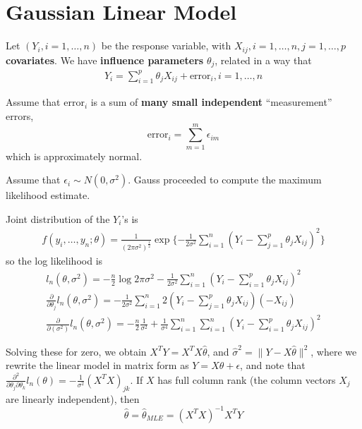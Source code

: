 
\chapter{Gaussian Linear Model}
\label{cha:gauss-line-model}

Let $(Y_{i}, i = 1, \dots, n)$ be the response variable, with $X_{ij},
i = 1, \dots, n, j = 1, \dots, p$ \textbf{covariates}. We have
\textbf{influence parameters} $\theta_{j}$, related in a way that
\begin{align}
  \label{eq:100}
  Y_{i} = \sum_{i=1}^{p} \theta_{j} X_{ij} + \text{error}_{i}, i = 1,
  \dots, n
\end{align}

Assume that $\text{error}_{i}$ is a sum of \textbf{many small
  independent} ``measurement'' errors,
\begin{equation}
  \label{eq:100}
  \text{error}_{i} = \sum_{m=1}^{m} \epsilon_{im} 
\end{equation} which is approximately normal.

Assume that $\epsilon_{i} \sim N(0, \sigma^{2})$. Gauss proceeded to
compute the maximum likelihood estimate.

\begin{proposition}
  Joint distribution of the $Y_{i}$'s is
  \begin{align}
    \label{eq:100}
    f(y_{i}, \dots, y_{n}; \theta) = \frac{1}{(2 \pi
      \sigma^{2})^{\frac{1}{2}}} \exp \{ - \frac{1}{2 \sigma^{2}}
    \sum_{i=1}^{n} (Y_{i} - \sum_{j=1}^{p} \theta_{j} X_{ij})^{2} \}
  \end{align} so the log likelihood is
  \begin{align}
    \label{eq:100}
    l_{n}(\theta, \sigma^{2}) = -\frac{n}{2} \log 2 \pi \sigma^{2} -
    \frac{1}{2 \sigma^{2}} \sum_{i=1}^{n}(Y_{i}  - \sum_{i=1}^{p}
    \theta_{j} X_{ij})^{2} \\
    \frac{\partial}{\partial \theta_{j}} l_{n}(\theta, \sigma^{2}) = -
    \frac{1}{2 \sigma^{2}} \sum_{i=1}^{n} 2(Y_{i} - \sum_{j=1}^{p}
    \theta_{j} X_{ij})(-X_{ij}) \\
    \frac{\partial}{\partial (\sigma^{2})} l_{n}(\theta, \sigma^{2}) =
    - \frac{n}{2} \frac{1}{\sigma^{2}} + \frac{1}{\sigma^{4}}
    \sum_{i=1}^{n} \sum_{i=1}^{n} (Y_{i} - \sum_{i=1}^{p} \theta_{j} X_{ij})^{2}
  \end{align}

  Solving these for zero, we obtain $X^{T} Y = X^{T} X \hat \theta$,
  and $\hat \sigma^{2} = \| Y - X \hat \theta \|^{2}$, where we
  rewrite the linear model in matrix form as $Y = X \theta +
  \epsilon$, and note that $\frac{\partial^{2}}{\partial
    \theta_{j} \partial \theta_{k}} l_{n}(\theta) = -
  \frac{1}{\sigma^{2}} (X^{T} X)_{jk}$.  If $X$ has full column rank
  (the column vectors $X_{j}$ are linearly independent), then
  \begin{equation}
    \label{eq:100}
    \hat \theta = \hat \theta_{MLE} = (X^{T} X)^{-1} X^{T} Y
  \end{equation}
\end{proposition}

